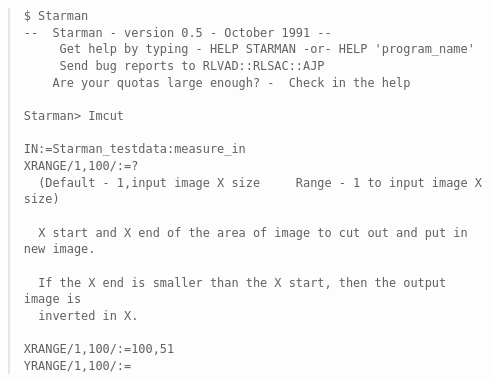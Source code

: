 \begin{quote}
\begin{tabbing} %
\verb#$ Starman                                                                  # \\
\verb#--  Starman - version 0.5 - October 1991 --                                #\\
\verb#     Get help by typing - HELP STARMAN -or- HELP 'program_name'            #\\
\verb#     Send bug reports to RLVAD::RLSAC::AJP                                 #\\
\verb#    Are your quotas large enough? -  Check in the help                     #\\
\verb#                                                                           #\\
\verb#Starman> Imcut                                                             # \\
\verb#                                                                           #\\
\verb#IN:=Starman_testdata:measure_in                                            # \\
\verb#XRANGE/1,100/:=?                                                           # \\
\verb#  (Default - 1,input image X size     Range - 1 to input image X size)     #\\
\verb#                                                                           #\\  
\verb#  X start and X end of the area of image to cut out and put in new image.  #\\
\verb#                                                                           #\\  
\verb#  If the X end is smaller than the X start, then the output image is       #\\  
\verb#  inverted in X.                                                           #\\  
\verb#                                                                           #\\  
\verb#XRANGE/1,100/:=100,51                                                      # \\
\verb#YRANGE/1,100/:=                                                            # \\

\end{tabbing}
\end{quote}
